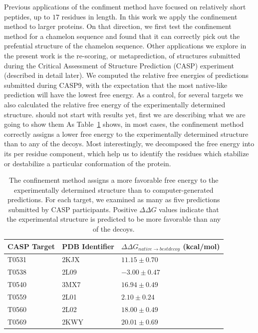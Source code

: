 \documentclass[12pt]{article}
\newcommand{\Alberto}[1]{\color{ForestGreen}#1\normalcolor }
\begin{document}
Previous applications of the confiment method have focused on relatively short peptides, up to $17$
residues in length. In this work we apply the confinement method to
larger proteins. On that direction, we first test the confinement method for a chamelon sequence and 
found that it can correctly pick out the prefential structure of the chamelon sequence. Other 
applications we explore in the present work is the re-scoring, or
metaprediction, of structures submitted during the Critical Assessment of Structure Prediction
(CASP) experiment (described in detail later). We computed the relative free energies of predictions
submitted during CASP9, with the expectation that the most native-like prediction will have
the lowest free energy. As a control, for several targets we also calculated the relative free
energy of the experimentally determined structure. \Alberto{should not start with results yet, first
we are describing what we are going to show them} As
Table~\ref{table:casp_control} shows, in most cases, the confinement method correctly assigns a
lower free energy to the experimentally determined structure than to any of the decoys. 
Most interestingly, we decomposed the free energy into its per residue component, which help 
us to identify the residues which stabilize or destabilize a particular conformation of the protein.

\begin{table}
\begin{center}
\caption{The confinement method assigns a more favorable free energy to the experimentally
determined structure than to computer-generated predictions. For each target, we examined as many as
five predictions submitted by CASP participants. Positive $\Delta\Delta G$ values indicate that the
experimental structure is predicted to be more favorable than any of the decoys.}
\label{table:casp_control}
\begin{tabular}{l l l}\hline
    CASP Target  & PDB Identifier & $\Delta\Delta G_{native \to best decoy}$ (kcal/mol) \\ \hline
     T0531       &    2KJX        &          $11.15 \pm 0.70$ \\ \hline
     T0538       &    2L09        &          $-3.00 \pm 0.47$ \\ \hline
     T0540       &    3MX7        &          $16.94 \pm 0.49$ \\ \hline
     T0559       &    2L01        &          $2.10 \pm 0.24$ \\ \hline
     T0560       &    2L02        &          $18.00 \pm 0.49$ \\ \hline
     T0569       &    2KWY        &          $20.01 \pm 0.69$  \\ \hline
\end{tabular}
\end{center}

\end{table}
\end{document}
